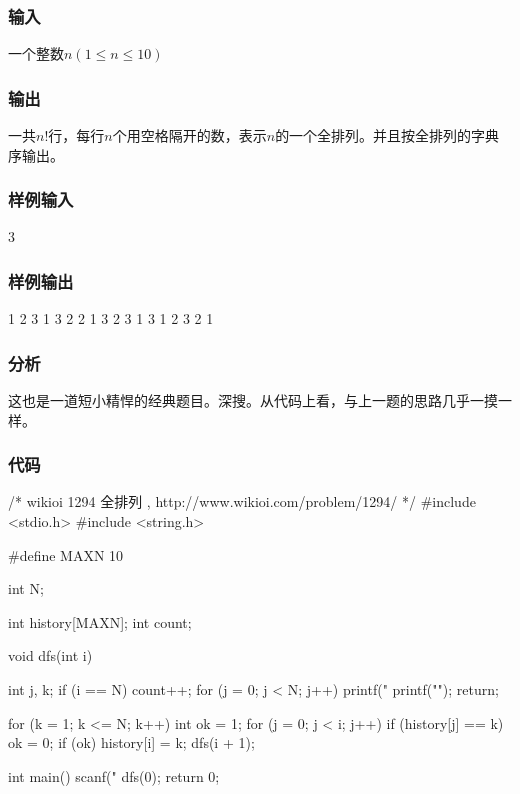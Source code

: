 \subsubsection{输入}
一个整数$n(1 \leq n \leq 10)$

\subsubsection{输出}
一共$n!$行，每行$n$个用空格隔开的数，表示$n$的一个全排列。并且按全排列的字典序输出。

\subsubsection{样例输入}
\begin{Code}
3
\end{Code}

\subsubsection{样例输出}
\begin{Code}
1 2 3
1 3 2
2 1 3
2 3 1
3 1 2
3 2 1
\end{Code}

\subsubsection{分析}
这也是一道短小精悍的经典题目。深搜。从代码上看，与上一题的思路几乎一摸一样。

\subsubsection{代码}
\begin{Codex}[label=all_permutations.c]
/* wikioi 1294 全排列   , http://www.wikioi.com/problem/1294/ */
#include <stdio.h>
#include <string.h>

#define MAXN 10

int N;

int history[MAXN];
int count;

void dfs(int i) {
    int j, k;
    if (i == N) {
        count++;
        for (j = 0; j < N; j++) {
            printf("%
        }
        printf("\n");
        return;
    }

    for (k = 1; k <= N; k++) {
        int ok = 1;
        for (j = 0; j < i; j++) {
            if (history[j] == k)
                ok = 0;
        }
        if (ok) {
            history[i] = k;
            dfs(i + 1);
        }
    }
}

int main() {
    scanf("%
    dfs(0);
    return 0;
}
\end{Codex}


